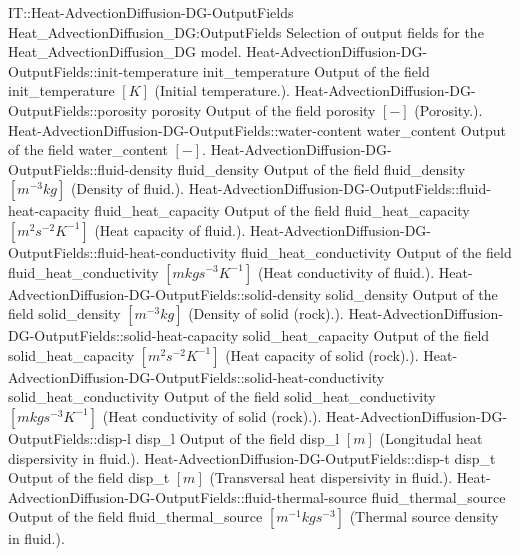 \begin{SelectionType}
	{IT::Heat-AdvectionDiffusion-DG-OutputFields}
	{Heat{\_}AdvectionDiffusion{\_}DG:OutputFields}
	{{{Selection of output fields for the Heat{\_}AdvectionDiffusion{\_}DG model.}}}
		\SelectionItem
			{Heat-AdvectionDiffusion-DG-OutputFields::init-temperature}
			{init{\_}temperature}
			{{{Output of the field init{\_}temperature }{$[K]$}{ (Initial temperature.).}}}
		\SelectionItem
			{Heat-AdvectionDiffusion-DG-OutputFields::porosity}
			{porosity}
			{{{Output of the field porosity }{$[-]$}{ (Porosity.).}}}
		\SelectionItem
			{Heat-AdvectionDiffusion-DG-OutputFields::water-content}
			{water{\_}content}
			{{{Output of the field water{\_}content }{$[-]$}{.}}}
		\SelectionItem
			{Heat-AdvectionDiffusion-DG-OutputFields::fluid-density}
			{fluid{\_}density}
			{{{Output of the field fluid{\_}density }{$[m^{-3}kg]$}{ (Density of fluid.).}}}
		\SelectionItem
			{Heat-AdvectionDiffusion-DG-OutputFields::fluid-heat-capacity}
			{fluid{\_}heat{\_}capacity}
			{{{Output of the field fluid{\_}heat{\_}capacity }{$[m^{2}s^{-2}K^{-1}]$}{ (Heat capacity of fluid.).}}}
		\SelectionItem
			{Heat-AdvectionDiffusion-DG-OutputFields::fluid-heat-conductivity}
			{fluid{\_}heat{\_}conductivity}
			{{{Output of the field fluid{\_}heat{\_}conductivity }{$[mkgs^{-3}K^{-1}]$}{ (Heat conductivity of fluid.).}}}
		\SelectionItem
			{Heat-AdvectionDiffusion-DG-OutputFields::solid-density}
			{solid{\_}density}
			{{{Output of the field solid{\_}density }{$[m^{-3}kg]$}{ (Density of solid (rock).).}}}
		\SelectionItem
			{Heat-AdvectionDiffusion-DG-OutputFields::solid-heat-capacity}
			{solid{\_}heat{\_}capacity}
			{{{Output of the field solid{\_}heat{\_}capacity }{$[m^{2}s^{-2}K^{-1}]$}{ (Heat capacity of solid (rock).).}}}
		\SelectionItem
			{Heat-AdvectionDiffusion-DG-OutputFields::solid-heat-conductivity}
			{solid{\_}heat{\_}conductivity}
			{{{Output of the field solid{\_}heat{\_}conductivity }{$[mkgs^{-3}K^{-1}]$}{ (Heat conductivity of solid (rock).).}}}
		\SelectionItem
			{Heat-AdvectionDiffusion-DG-OutputFields::disp-l}
			{disp{\_}l}
			{{{Output of the field disp{\_}l }{$[m]$}{ (Longitudal heat dispersivity in fluid.).}}}
		\SelectionItem
			{Heat-AdvectionDiffusion-DG-OutputFields::disp-t}
			{disp{\_}t}
			{{{Output of the field disp{\_}t }{$[m]$}{ (Transversal heat dispersivity in fluid.).}}}
		\SelectionItem
			{Heat-AdvectionDiffusion-DG-OutputFields::fluid-thermal-source}
			{fluid{\_}thermal{\_}source}
			{{{Output of the field fluid{\_}thermal{\_}source }{$[m^{-1}kgs^{-3}]$}{ (Thermal source density in fluid.).}}}

\end{SelectionType}
